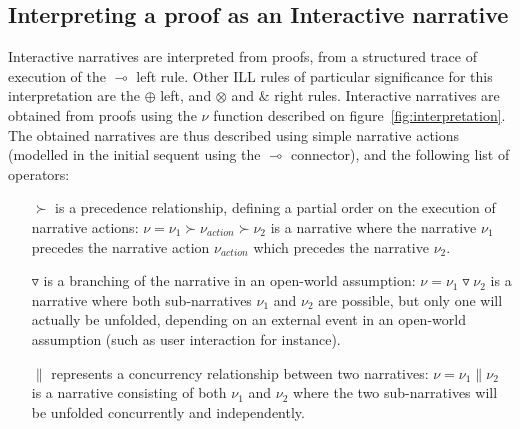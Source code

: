 \documentclass[runningheads,a4paper]{llncs}
\begin{document}
\subsection{Interpreting a proof as an Interactive narrative\label{subsec:proof_to_narrative}}
Interactive narratives are interpreted from proofs, from a structured trace of execution of the $\multimap$ left rule. Other ILL rules of particular significance for this interpretation are the $\oplus$ left, and $\otimes$ and $\&$ right rules. Interactive narratives are obtained from proofs using the $\nu$ function described on figure~\ref{fig:interpretation}. The obtained narratives are thus described using simple narrative actions (modelled in the initial sequent using the $\multimap$ connector), and the following list of operators:
\begin{itemize}
\item [$\succ$] is a precedence relationship, defining a partial order on the execution of narrative actions: $\nu=\nu_1\succ \nu_{action} \succ \nu_2$ is a narrative where the narrative $\nu_1$ precedes the narrative action $\nu_{action}$ which precedes the narrative $\nu_2$.
\item [$\triangledown$] is a branching of the narrative in an open-world assumption: $\nu=\nu_1\triangledown\nu_2$ is a narrative where both sub-narratives $\nu_1$ and $\nu_2$ are possible, but only one will actually be unfolded, depending on an external event in an open-world assumption (such as user interaction for instance).
\item [$\|$] represents a concurrency relationship between two narratives: $\nu=\nu_1\|\nu_2$ is a narrative consisting of both $\nu_1$ and $\nu_2$ where the two sub-narratives will be unfolded concurrently and independently.
\end{itemize}
\end{document}
